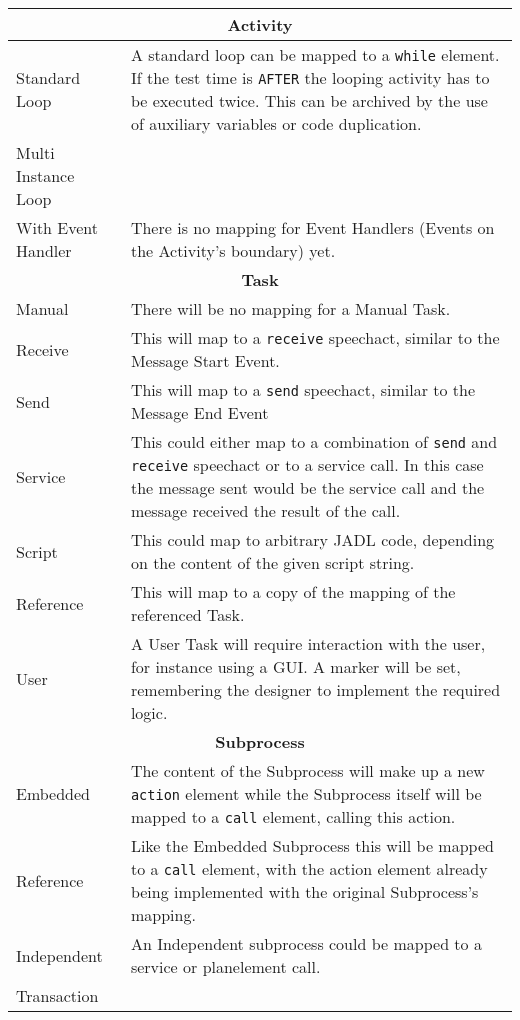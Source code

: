 \begin{longtable}{|p{3.5cm}|p{10.5cm}|}
\hline
\multicolumn{2}{|c|}{\textbf{Activity}}
\\\hline
Standard Loop           & A standard loop can be mapped to a \verb|while| element. If the test time is \verb|AFTER| the looping activity has to be executed twice. This can be archived by the use of auxiliary variables or code duplication.
\\\hline
Multi Instance Loop     &
\\\hline
With Event Handler & There is no mapping for Event Handlers (Events on the Activity's boundary) yet.
\\\hline

\hline
\multicolumn{2}{|c|}{\textbf{Task}}
\\\hline
Manual                  & There will be no mapping for a Manual Task.
\\\hline
Receive                 & This will map to a \verb|receive| speechact, similar to the Message Start Event.
\\\hline
Send                    & This will map to a \verb|send| speechact, similar to the Message End Event
\\\hline
Service                 & This could either map to a combination of \verb|send| and \verb|receive| speechact or to a service call. In this case the message sent would be the service call and the message received the result of the call.
\\\hline
Script                  & This could map to arbitrary JADL code, depending on the content of the given script string.
\\\hline
Reference               & This will map to a copy of the mapping of the referenced Task.
\\\hline
User                    & A User Task will require interaction with the user, for instance using a GUI. A marker will be set, remembering the designer to implement the required logic.
\\\hline

\hline
\multicolumn{2}{|c|}{\textbf{Subprocess}}
\\\hline
Embedded                & The content of the Subprocess will make up a new \verb|action| element while the Subprocess itself will be mapped to a \verb|call| element, calling this action.
\\\hline
Reference               & Like the Embedded Subprocess this will be mapped to a \verb|call| element, with the action element already being implemented with the original Subprocess's mapping.
\\\hline
Independent             & An Independent subprocess could be mapped to a service or planelement call.
\\\hline
Transaction             &
\\\hline
\end{longtable}


